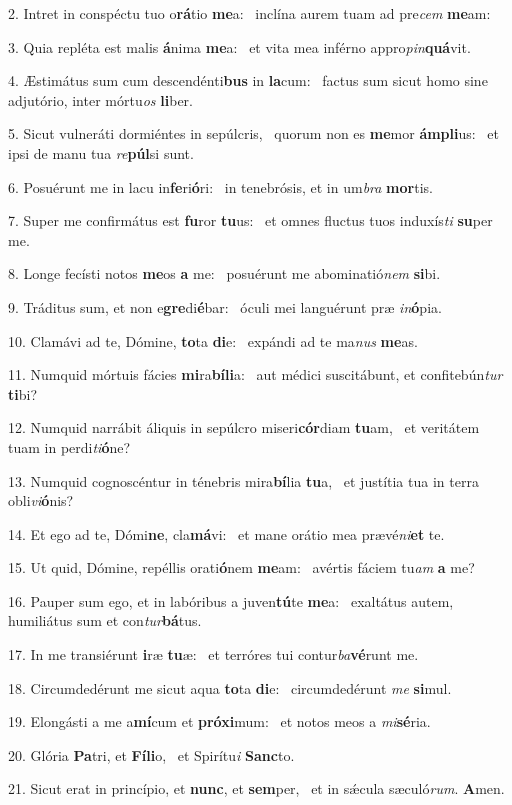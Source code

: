2. Intret in conspéctu tuo o\textbf{rá}tio \textbf{me}a: \ast\  inclína aurem tuam ad pre\textit{cem} \textbf{me}am:\

3. Quia repléta est malis \textbf{á}nima \textbf{me}a: \ast\  et vita mea inférno appro\textit{pin}\textbf{quá}vit.\

4. Æstimátus sum cum descendénti\textbf{bus} in \textbf{la}cum: \ast\  factus sum sicut homo sine adjutório, inter mórtu\textit{os} \textbf{li}ber.\

5. Sicut vulneráti dormiéntes in sepúlcris, \dag\  quorum non es \textbf{me}mor \textbf{ám}\textbf{pli}us: \ast\  et ipsi de manu tua \textit{re}\textbf{púl}si sunt.\

6. Posuérunt me in lacu in\textbf{fe}ri\textbf{ó}ri: \ast\  in tenebrósis, et in um\textit{bra} \textbf{mor}tis.\

7. Super me confirmátus est \textbf{fu}ror \textbf{tu}us: \ast\  et omnes fluctus tuos induxís\textit{ti} \textbf{su}per me.\

8. Longe fecísti notos \textbf{me}os \textbf{a} me: \ast\  posuérunt me abominatió\textit{nem} \textbf{si}bi.\

9. Tráditus sum, et non e\textbf{gre}di\textbf{é}bar: \ast\  óculi mei languérunt præ \textit{in}\textbf{ó}pia.\

10. Clamávi ad te, Dómine, \textbf{to}ta \textbf{di}e: \ast\  expándi ad te ma\textit{nus} \textbf{me}as.\

11. Numquid mórtuis fácies \textbf{mi}ra\textbf{bí}\textbf{li}a: \ast\  aut médici suscitábunt, et confitebún\textit{tur} \textbf{ti}bi?\

12. Numquid narrábit áliquis in sepúlcro miseri\textbf{cór}diam \textbf{tu}am, \ast\  et veritátem tuam in perdi\textit{ti}\textbf{ó}ne?\

13. Numquid cognoscéntur in ténebris mira\textbf{bí}lia \textbf{tu}a, \ast\  et justítia tua in terra obli\textit{vi}\textbf{ó}nis?\

14. Et ego ad te, Dómi\textbf{ne}, cla\textbf{má}vi: \ast\  et mane orátio mea prævé\textit{ni}\textbf{et} te.\

15. Ut quid, Dómine, repéllis orati\textbf{ó}nem \textbf{me}am: \ast\  avértis fáciem tu\textit{am} \textbf{a} me?\

16. Pauper sum ego, et in labóribus a juven\textbf{tú}te \textbf{me}a: \ast\  exaltátus autem, humiliátus sum et con\textit{tur}\textbf{bá}tus.\

17. In me transiérunt \textbf{i}ræ \textbf{tu}æ: \ast\  et terróres tui contur\textit{ba}\textbf{vé}runt me.\

18. Circumdedérunt me sicut aqua \textbf{to}ta \textbf{di}e: \ast\  circumdedérunt \textit{me} \textbf{si}mul.\

19. Elongásti a me a\textbf{mí}cum et \textbf{pró}\textbf{xi}mum: \ast\  et notos meos a \textit{mi}\textbf{sé}ria.\

20. Glória \textbf{Pa}tri, et \textbf{Fí}\textbf{li}o, \ast\  et Spirítu\textit{i} \textbf{Sanc}to.\

21. Sicut erat in princípio, et \textbf{nunc}, et \textbf{sem}per, \ast\  et in sǽcula sæculó\textit{rum}. \textbf{A}men.\

